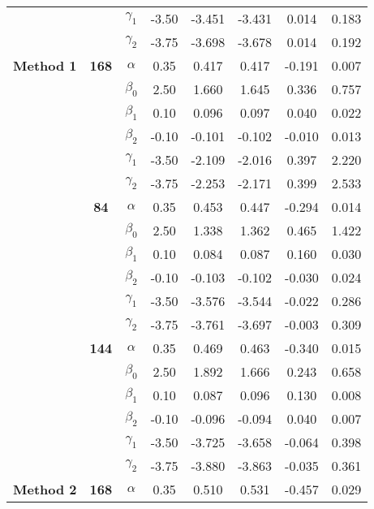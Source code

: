 \begin{table}[h]
\begin{tabular}[t]{>{}c>{}ccccccc}
 &  & $\gamma_1$ & -3.50 & -3.451 & -3.431 & 0.014 & 0.183\\

 &  & $\gamma_2$ & -3.75 & -3.698 & -3.678 & 0.014 & 0.192\\

\multirow{-18}{*}{\centering\arraybackslash \textbf{Method 1}} & \multirow{-6}{*}{\centering\arraybackslash \textbf{168}} & $\alpha$ & 0.35 & 0.417 & 0.417 & -0.191 & 0.007\\
\cmidrule{1-8}
 &  & $\beta_0$ & 2.50 & 1.660 & 1.645 & 0.336 & 0.757\\

 &  & $\beta_1$ & 0.10 & 0.096 & 0.097 & 0.040 & 0.022\\

 &  & $\beta_2$ & -0.10 & -0.101 & -0.102 & -0.010 & 0.013\\

 &  & $\gamma_1$ & -3.50 & -2.109 & -2.016 & 0.397 & 2.220\\

 &  & $\gamma_2$ & -3.75 & -2.253 & -2.171 & 0.399 & 2.533\\

 & \multirow{-6}{*}{\centering\arraybackslash \textbf{84}} & $\alpha$ & 0.35 & 0.453 & 0.447 & -0.294 & 0.014\\

 &  & $\beta_0$ & 2.50 & 1.338 & 1.362 & 0.465 & 1.422\\

 &  & $\beta_1$ & 0.10 & 0.084 & 0.087 & 0.160 & 0.030\\

 &  & $\beta_2$ & -0.10 & -0.103 & -0.102 & -0.030 & 0.024\\

 &  & $\gamma_1$ & -3.50 & -3.576 & -3.544 & -0.022 & 0.286\\

 &  & $\gamma_2$ & -3.75 & -3.761 & -3.697 & -0.003 & 0.309\\

 & \multirow{-6}{*}{\centering\arraybackslash \textbf{144}} & $\alpha$ & 0.35 & 0.469 & 0.463 & -0.340 & 0.015\\

 &  & $\beta_0$ & 2.50 & 1.892 & 1.666 & 0.243 & 0.658\\

 &  & $\beta_1$ & 0.10 & 0.087 & 0.096 & 0.130 & 0.008\\

 &  & $\beta_2$ & -0.10 & -0.096 & -0.094 & 0.040 & 0.007\\

 &  & $\gamma_1$ & -3.50 & -3.725 & -3.658 & -0.064 & 0.398\\

 &  & $\gamma_2$ & -3.75 & -3.880 & -3.863 & -0.035 & 0.361\\

\multirow{-18}{*}{\centering\arraybackslash \textbf{Method 2}} & \multirow{-6}{*}{\centering\arraybackslash \textbf{168}} & $\alpha$ & 0.35 & 0.510 & 0.531 & -0.457 & 0.029\\
\bottomrule
\end{tabular}
\end{table}
